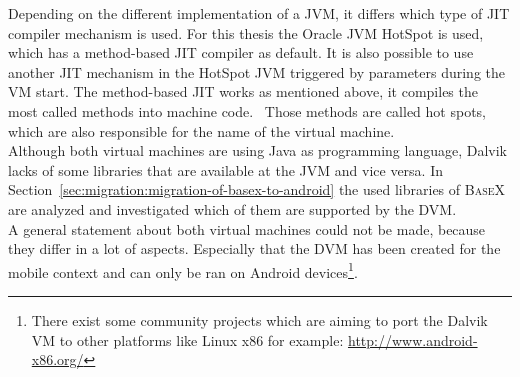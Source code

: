 Depending on the different implementation of a JVM, it differs which type of JIT compiler mechanism is used.
For this thesis the Oracle JVM HotSpot is used, which has a method-based JIT compiler as default.
It is also possible to use another JIT mechanism in the HotSpot JVM triggered by parameters during the VM start.
The method-based JIT works as mentioned above, it compiles the most called methods into machine code.~\cite{kotzmann2008design}
Those methods are called hot spots, which are also responsible for the name of the virtual machine.~\cite{paleczny2001java}
\\
Although both virtual machines are using Java as programming language, Dalvik lacks of some libraries that are available at the JVM and vice versa.
In Section~\ref{sec:migration:migration-of-basex-to-android} the used libraries of \textsc{BaseX} are analyzed and investigated which of them are supported by the DVM.\\
A general statement about both virtual machines could not be made, because they differ in a lot of aspects.
Especially that the DVM has been created for the mobile context and can only be ran on Android devices\footnote{There exist some community projects which are aiming to port the Dalvik VM to other platforms like Linux x86 for example: \url{http://www.android-x86.org/}}.



